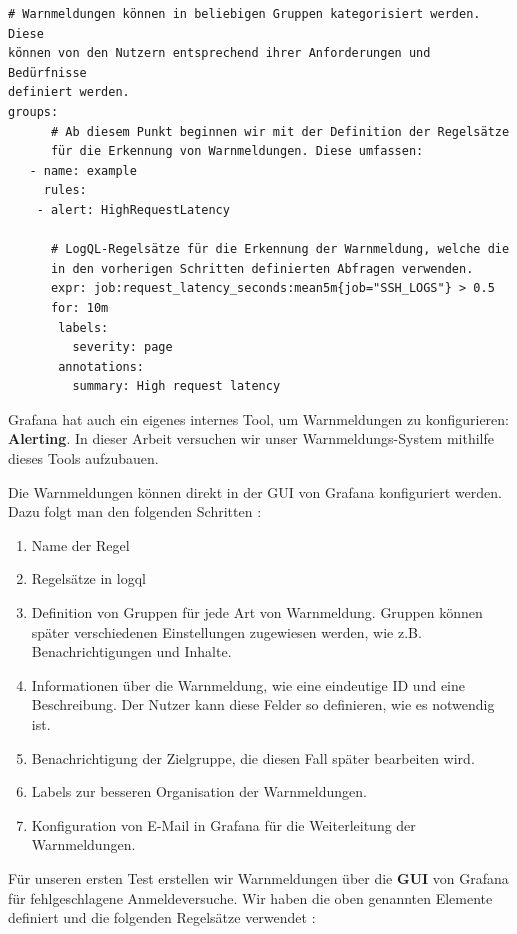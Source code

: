{
\begin{Verbatim}[frame=single]
# Warnmeldungen können in beliebigen Gruppen kategorisiert werden. Diese
können von den Nutzern entsprechend ihrer Anforderungen und Bedürfnisse 
definiert werden.
groups:
      # Ab diesem Punkt beginnen wir mit der Definition der Regelsätze 
      für die Erkennung von Warnmeldungen. Diese umfassen:
   - name: example
     rules:
    - alert: HighRequestLatency

      # LogQL-Regelsätze für die Erkennung der Warnmeldung, welche die 
      in den vorherigen Schritten definierten Abfragen verwenden.
      expr: job:request_latency_seconds:mean5m{job="SSH_LOGS"} > 0.5
      for: 10m
       labels:
         severity: page
       annotations:
         summary: High request latency
\end{Verbatim}
}

\newpage
Grafana hat auch ein eigenes internes Tool, um Warnmeldungen zu konfigurieren: \textbf{Alerting}. In dieser Arbeit versuchen wir unser Warnmeldungs-System mithilfe dieses Tools aufzubauen.

Die Warnmeldungen können direkt in der \gls{GUI} von Grafana konfiguriert werden. Dazu folgt man den folgenden Schritten \citep{Grafana_alerting}:

{
\begin{enumerate}[noitemsep]
   \item Name der Regel
   \item Regelsätze in \gls{logql}
   \item Definition von Gruppen für jede Art von Warnmeldung. Gruppen können später verschiedenen Einstellungen zugewiesen werden, wie z.B. Benachrichtigungen und Inhalte.
   \item Informationen über die Warnmeldung, wie eine eindeutige ID und eine Beschreibung. Der Nutzer kann diese Felder so definieren, wie es notwendig ist.
   \item Benachrichtigung der Zielgruppe, die diesen Fall später bearbeiten wird.
   \item Labels zur besseren Organisation der Warnmeldungen.
   \item Konfiguration von E-Mail in Grafana für die Weiterleitung der Warnmeldungen.
\end{enumerate}
}

Für unseren ersten Test erstellen wir Warnmeldungen über die \textbf{\gls{GUI}} von Grafana für fehlgeschlagene Anmeldeversuche. Wir haben die oben genannten Elemente definiert und die folgenden Regelsätze verwendet \citep{VoidQuark_sshlogs}:

